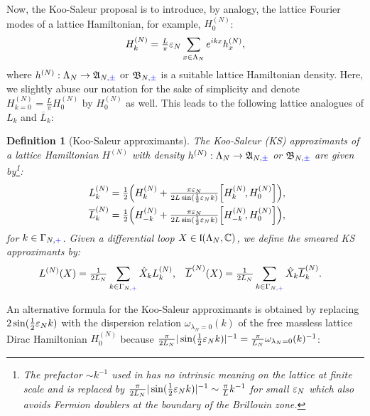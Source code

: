 \documentclass[a4paper, 11pt]{article}
\newcommand{\fA}{\mathfrak{A}}\newcommand{\cA}{\mathcal{A}}\newcommand{\dA}{\mathds{A}}\newcommand{\sA}{\mathscr{A}}
\newcommand{\fB}{\mathfrak{B}}\newcommand{\cB}{\mathcal{B}}\newcommand{\dB}{\mathds{B}}\newcommand{\sB}{\mathscr{B}}
\newcommand{\fl}{\mathfrak{l}}\newcommand{\cl}{\mathcal{l}}
\DeclareMathOperator{\1}{\mathds{1}}
\newtheorem{defn}[thm]{Definition}
\begin{document}
Now, the Koo-Saleur proposal is to introduce, by analogy, the lattice Fourier modes of a lattice Hamiltonian, for example, $H^{(N)}_{0}$:
\begin{align}
\label{eq:hdfourier}
H_k^{(N)} = \tfrac{L}{\pi}\varepsilon_{N}\sum_{x\in \Lambda_{N}} e^{ikx} h^{(N)}_x,
\end{align}
where $h^{(N)}:\Lambda_{N}\rightarrow\fA_{N,{\color{blue}\pm}}$ or $\fB_{N,{\color{blue}\pm}}$ is a suitable lattice Hamiltonian density. Here, we slightly abuse our notation for the sake of simplicity and denote $H^{(N)}_{k=0}=\tfrac{L}{\pi}H^{(N)}_{0}$ by $H^{(N)}_{0}$ as well. This leads to the following lattice analogues of $L_k$ and $\overline{L}_{k}$:
\begin{defn}[Koo-Saleur approximants]
\label{def:KSapprox}
The \emph{Koo-Saleur (KS) approximants} of a lattice Hamiltonian $H^{(N)}$ with density $h^{(N)}:\Lambda_{N}\rightarrow\fA_{N,{\color{blue}\pm}}$ or $\fB_{N,{\color{blue}\pm}}$ are given by\footnote{The prefactor $\sim k^{-1}$ used in \cite{MilstedExtractionOfConformal} has no intrinsic meaning on the lattice at finite scale and is replaced by $\tfrac{\pi}{2L_{N}}|\sin(\tfrac{1}{2}\varepsilon_{N}k)|^{-1}\sim\tfrac{\pi}{L}k^{-1}$ for small $\varepsilon_{N}$ which also avoids Fermion doublers at the boundary of the Brillouin zone.}:
\begin{align}
\label{eq:latviracpt}
L_{k}^{(N)} & = \tfrac{1}{2}\Big(H_{k}^{(N)}+\tfrac{\pi\vep_{N}}{2L\sin(\frac{1}{2}\vep_{N}k)}\Big[H_{k}^{(N)}\!,H_0^{(N)}\Big]\Big), \\ \nonumber
\overline{L}_{k}^{(N)} & = \tfrac{1}{2}\Big(H_{-k}^{(N)}+\tfrac{\pi\vep_{N}}{2L\sin(\frac{1}{2}\vep_{N}k)}\Big[H_{-k}^{(N)}\!,H_0^{(N)}\Big]\Big),
\end{align}
for $k\in\Gamma_{N,{\color{blue}+}}$. Given a differential loop $X\in\fl(\Lambda_{N},\C)$, we define the smeared KS approximants by:
\begin{align}
\label{eq:latvirasmeared}
L^{(N)}(X) & = \tfrac{1}{2L_{N}}\sum_{k\in\Gamma_{N,{\color{blue}+}}}\hat{X}_{k}L_{k}^{(N)}, & \overline{L}^{(N)}(X) & = \tfrac{1}{2L_{N}}\sum_{k\in\Gamma_{N,{\color{blue}+}}}\hat{X}_{k}\overline{L}_{k}^{(N)}.
\end{align}
\end{defn}
An alternative formula for the Koo-Saleur approximants is obtained by replacing $2\sin(\tfrac{1}{2}\varepsilon_{N}k)$ with the dispersion relation $\omega_{\lambda_{N}=0}(k)$ of the free massless lattice Dirac Hamiltonian $H^{(N)}_{0}$ because $\tfrac{\pi}{2L_{N}}|\sin(\tfrac{1}{2}\varepsilon_{N}k)|^{-1}=\tfrac{\pi}{L_{N}}\omega_{\lambda_{N}=0}(k)^{-1}$:
\end{document}
